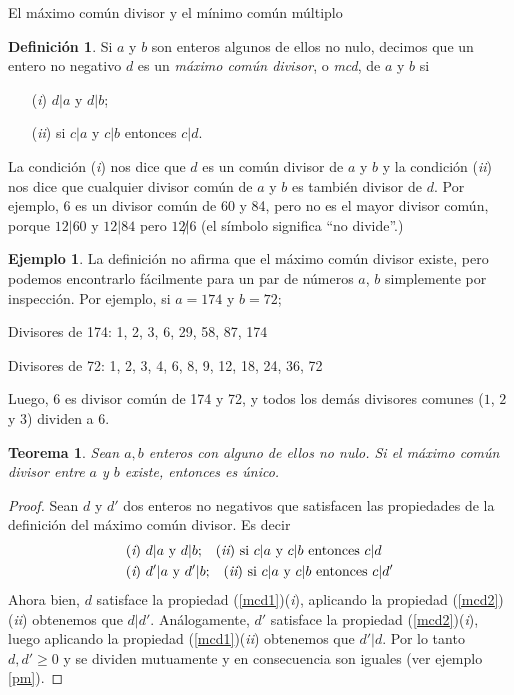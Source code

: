 \documentclass[11pt,spanish,makeidx]{amsbook}
\newtheorem{teorema}{Teorema}[section]
\theoremstyle{definition}
\newtheorem{definicion}{Definici\'on}[section]
\newtheorem{ejemplo}{Ejemplo}[section]
\theoremstyle{remark}
\begin{document}
\begin{section}{El máximo común divisor y el mínimo común múltiplo}\label{1.7}

\begin{definicion}\label{mcd} Si $a$ y $b$ son enteros algunos de ellos no nulo, decimos que un entero no negativo $d$ es un {\em máximo común divisor}, o {\em mcd}, de $a$ y $b$ si
\begin{enumerate}
\item[({\em i})] $ d|a$ y $d|b$;
\item[({\em ii})] si $ c|a $ y $c|b$ entonces $ c|d$.
\end{enumerate}
\end{definicion}
La condición ({\em i}) nos dice que $d$ es un común divisor de $a$ y $b$ y la condición ({\em ii}) nos dice que cualquier divisor común de $a$ y $b$ es también divisor de $d$. Por ejemplo, 6 es un divisor común de 60 y 84, pero no es el mayor divisor común, porque $12|60$ y $12|84$ pero $12{\not|}6$ (el símbolo significa ``no divide''.)

\begin{ejemplo} La definición no afirma que el máximo común divisor existe, pero podemos encontrarlo fácilmente para un par de números $a$, $b$ simplemente por inspección. Por  ejemplo, si $a = 174$ y $b =72$;

Divisores de 174: 1, 2, 3, 6, 29, 58, 87, 174

Divisores de 72: 1, 2, 3, 4, 6, 8, 9, 12, 18, 24, 36, 72 

Luego, $6$ es divisor común de 174 y 72, y todos los demás divisores comunes ($1$, $2$ y $3$) dividen a $6$.
\end{ejemplo}

\begin{teorema}\label{tmcd} 
Sean $a,b$ enteros con alguno de ellos no nulo. Si el máximo común divisor entre  $a$ y $b$ existe, entonces es único.  
\end{teorema}
\begin{proof}
Sean $d$ y $d'$ dos enteros no negativos que satisfacen las propiedades de la definición del máximo común divisor. Es decir
\begin{align}
&\text{({\em i}) $ d|a$ y $d|b$;\quad ({\em ii}) si $ c|a $ y $c|b$ entonces $ c|d$} \label{mcd1}\\
&\text{({\em i}) $ d'|a$ y $d'|b$;\quad ({\em ii}) si $ c|a $ y $c|b$ entonces $ c|d'$} \label{mcd2}
\end{align}
Ahora bien, $d$ satisface la propiedad (\ref{mcd1})({\em i}), aplicando la propiedad (\ref{mcd2})({\em ii}) obtenemos que $d|d'$. Análogamente,  $d'$ satisface la propiedad (\ref{mcd2})({\em i}),  luego aplicando la propiedad (\ref{mcd1})({\em ii}) obtenemos que $d'|d$. Por lo tanto $d, d' \ge 0$ y  se dividen mutuamente y en consecuencia son iguales (ver ejemplo \ref{pm}).
\end{proof}


\end{section}
\end{document}
